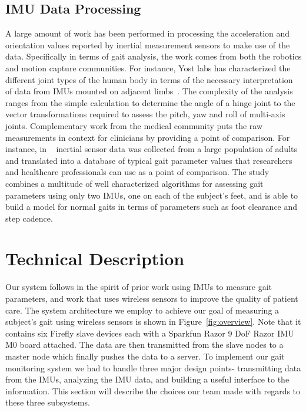\documentclass[conference]{IEEEtran}
\begin{document}
\subsection{IMU Data Processing}
A large amount of work has been performed in processing the acceleration and orientation
values reported by inertial measurement sensors to make use of the data. Specifically in
terms of gait analysis, the work comes from both the robotics and motion capture
communities. 
For instance, Yost labs has characterized the different joint types of the
human body in terms of the necessary interpretation of data from IMUs mounted on adjacent
limbs~\cite{yost}. The complexity of the analysis ranges from the simple calculation to
determine the angle of a hinge joint to the vector transformations required to assess the
pitch, yaw and roll of multi-axis joints. Complementary work from the medical community
puts the raw measurements in context for clinicians by providing a point of comparison.
For instance, in ~\cite{pop} inertial sensor data was collected from a large population
of adults and translated into a database of typical gait parameter values that researchers
and healthcare professionals can use as a point of comparison. The study combines a
multitude of well characterized algorithms for assessing gait parameters using only two
IMUs, one on each of the subject's feet, and is able to build a model for normal gaits
in terms of parameters such as foot clearance and step cadence. 


\section{Technical Description}
Our system follows in the spirit of prior work using IMUs to measure gait parameters, and
work that uses wireless sensors to improve the quality of patient care. The system
architecture we employ to achieve our goal of measuring a subject's gait using wireless
sensors is shown in Figure~\ref{fig:overview}. Note that it contains six Firefly slave devices
each with a Sparkfun Razor 9 DoF Razor IMU M0 board attached. The data are then
transmitted from the slave nodes to a master node which finally pushes the data to a
server. To implement our gait monitoring system we had to handle three major design
points- transmitting data from the IMUs, analyzing the IMU data, and building a useful
interface to the information. This section will describe the choices our team made with
regards to these three subsystems. 
\end{document}
